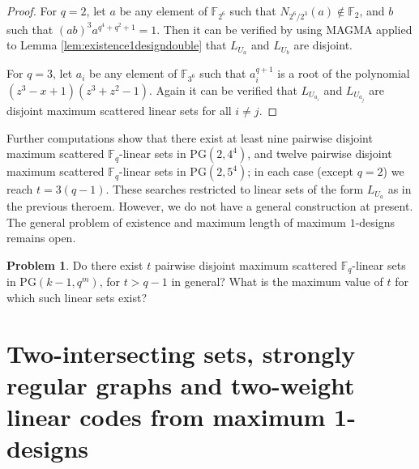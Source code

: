 \documentclass[11pt]{amsart}
\theoremstyle{definition}
\newtheorem{open}[theorem]{Problem}
\newcommand{\F}{{\mathbb F}}
\newcommand{\U}{{\mathcal{U}}}
\newcommand{\PG}{\mathrm{PG}}
\begin{document}
\begin{proof}


For $q=2$, let $a$ be any element of $\F_{2^6}$ such that $N_{2^6/2^3}(a)\notin \F_2$, and $b$ such that $(ab)^3a^{q^4+q^2+1}=1$. Then it can be verified by using MAGMA applied to Lemma \ref{lem:existence1designdouble} that $L_{U_a}$ and $L_{U_b}$ are disjoint.

For $q=3$, let $a_i$ be any element of $\F_{3^6}$ such that $a_i^{q+1}$ is a root of the polynomial $(z^3-x+1)(z^3+z^2-1)$. Again it can be verified that $L_{U_{a_i}}$ and $L_{U_{a_j}}$ are disjoint maximum scattered linear sets for all $i\ne j$.
\end{proof}

Further computations show that there exist at least nine pairwise disjoint maximum scattered $\F_q$-linear sets in $\PG(2,4^4)$, and twelve pairwise disjoint maximum scattered $\F_q$-linear sets in $\PG(2,5^4)$; in each case (except $q=2$) we reach $t=3(q-1)$. These searches restricted to linear sets of the form $L_{U_a}$ as in the previous theroem. However, we do not have a general construction at present. The general problem of existence and maximum length of maximum $1$-designs remains open.

\begin{open} Do there exist $t$ pairwise disjoint maximum scattered $\F_q$-linear sets in $\PG(k-1,q^m)$, for  $t>q-1$ in general? What is the maximum  value  of $t$ for which such linear sets exist?
\end{open}



\section{Two-intersecting sets, strongly regular graphs and two-weight linear codes from maximum 1-designs}
\end{document}

